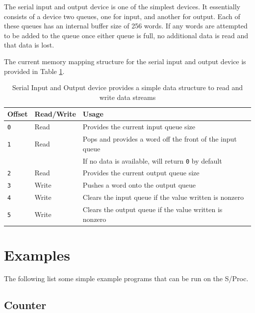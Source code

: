 \documentclass{article}
\begin{document}
The serial input and output device is one of the simplest devices. It essentially consists of a device two queues, one for input, and another for output. Each of these queues has an internal buffer size of 256 words. If any words are attempted to be added to the queue once either queue is full, no additional data is read and that data is lost.

The current memory mapping structure for the serial input and output device is provided in Table \ref{table:dev-serial-io}. 

\begin{table}[h!]
    \centering
    \begin{tabular}{l|ll}
        \hline
        Offset & Read/Write & Usage \\
        \hline
        \texttt{0} & Read & Provides the current input queue size \\
        \texttt{1} & Read & Pops and provides a word off the front of the input queue \\
        & & If no data is available, will return \texttt{0} by default \\
        \texttt{2} & Read & Provides the current output queue size \\
        \texttt{3} & Write & Pushes a word onto the output queue \\
        \texttt{4} & Write & Clears the input queue if the value written is nonzero \\
        \texttt{5} & Write & Clears the output queue if the value written is nonzero \\
        \hline
    \end{tabular}
    \caption{Serial Input and Output device provides a simple data structure to read and write data streams}
    \label{table:dev-serial-io}
\end{table}

\pagebreak

\section{Examples}

The following list some simple example programs that can be run on the S/Proc.

\subsection{Counter}
\end{document}
